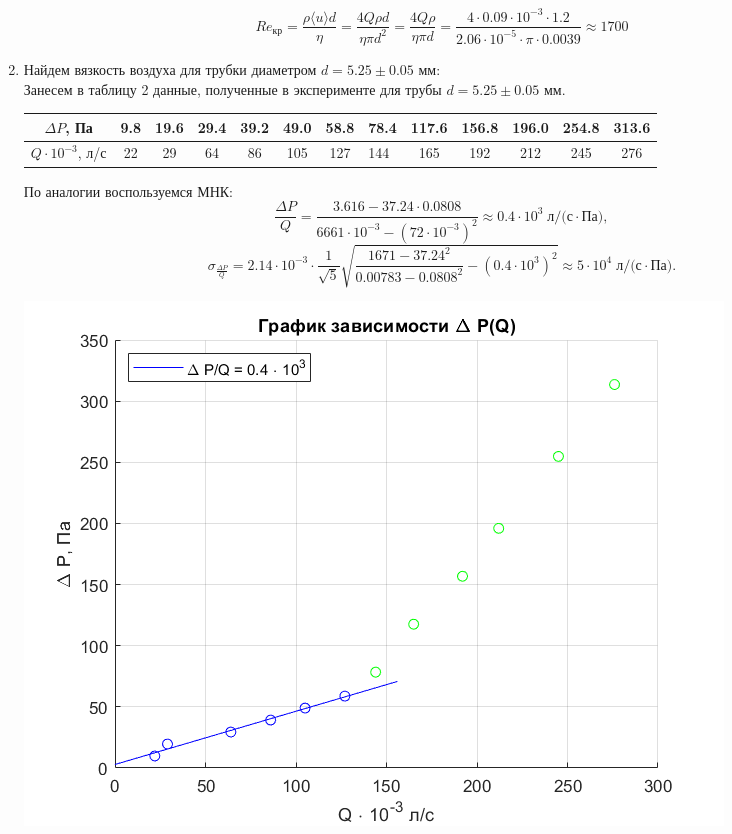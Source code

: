 \documentclass[a4paper,12pt]{article}
\begin{document}
\begin{enumerate}
\[
Re_\text{кр} = \frac{\rho \langle u \rangle d}{\eta} = \frac{4 Q \rho d}{\eta \pi d^2} = \frac{4 Q \rho}{\eta \pi d} = \frac{4 \cdot 0.09 \cdot 10^{-3} \cdot 1.2}{2.06 \cdot 10^{-5} \cdot \pi \cdot 0.0039} \approx 1700
\] 
\item Найдем вязкость воздуха для трубки диаметром $d = 5.25 \pm 0.05$ мм: \\
Занесем в таблицу 2 данные, полученные в эксперименте для трубы  $d = 5.25 \pm 0.05$ мм.
\begin{table}[h]
\begin{center}
\setlength{\tabcolsep}{2pt}
\begin{tabular}{|c||c|c|c|c|c|c|g|c|c|c|c|c|}
\hline 
$\Delta P$, Па & 9.8 & 19.6 & 29.4 & 39.2 & 49.0 & 58.8 & 78.4 & 117.6 & 156.8 & 196.0 & 254.8 & 313.6 \\ 
\hline 
$Q \cdot 10^{-3}$, л/с & 22 & 29 & 64 & 86 & 105 & 127 & 144 & 165 & 192 & 212 & 245 & 276 \\ 
\hline 

\end{tabular}
\end{center}
\end{table} 
По аналогии воспользуемся МНК:
\[
\frac{\Delta P}{Q} = \frac{ 3.616 - 37.24 \cdot 0.0808}{6661 \cdot 10^{-3} - (72 \cdot 10^{-3})^ 2} \approx 0.4 \cdot 10^{3} \; \text{л/(с} \cdot \text{Па)},
\]
\[
\sigma_{\frac{\Delta P}{Q}} = 2.14 \cdot 10 ^ {-3} \cdot \frac{1}{\sqrt{5}}\sqrt{\frac{1671 - 37.24^ 2}{0.00783 - 0.0808^ 2} - (0.4 \cdot 10^{3})^2} \approx 5 \cdot 10^{4} \; \text{л/(с} \cdot \text{Па)}.
\]

\begin{center}
\includegraphics[width=0.9\linewidth]{plot_2.png}
\end{center}


\end{enumerate}
\end{document}
